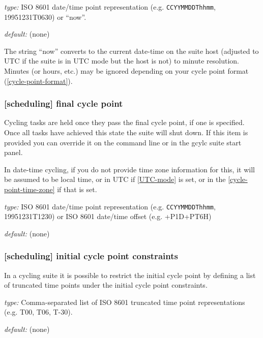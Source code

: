 \begin{myitemize}
    \item {\em type:} ISO 8601 date/time point representation (e.g.
 \lstinline=CCYYMMDDThhmm=, 19951231T0630) or ``now''.
    \item {\em default:} (none)
\end{myitemize}

The string ``now'' converts to the current date-time on the suite host (adjusted
to UTC if the suite is in UTC mode but the host is not) to minute resolution.
Minutes (or hours, etc.) may be ignored depending on your cycle point format
(\ref{cycle-point-format}).

\subsubsection[final cycle point]{[scheduling] \textrightarrow final cycle point}

Cycling tasks are held once they pass the final cycle point, if one is
specified. Once all tasks have achieved this state the suite will shut
down. If this item is provided you can override it on the command line
or in the gcylc suite start panel.

In date-time cycling, if you do not provide time zone information for this,
it will be assumed to be local time, or in UTC if \ref{UTC-mode} is set, or in
the \ref{cycle-point-time-zone} if that is set.

\begin{myitemize}
    \item {\em type:} ISO 8601 date/time point representation (e.g.
 \lstinline=CCYYMMDDThhmm=, 19951231T1230) or ISO 8601 date/time offset
    (e.g. +P1D+PT6H)
    \item {\em default:} (none)
\end{myitemize}

\subsubsection[initial cycle point constraints]{[scheduling] \textrightarrow initial cycle point constraints}
\label{initial cycle point constraints}

In a cycling suite it is possible to restrict the initial cycle point by
defining a list of truncated time points under the initial cycle point 
constraints.

\begin{myitemize}
    \item {\em type:} Comma-separated list of ISO 8601 truncated time point
        representations (e.g. T00, T06, T-30).
    \item {\em default:} (none)
\end{myitemize}

